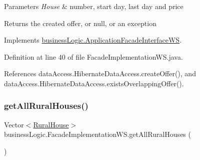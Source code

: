 \begin{DoxyParams}{Parameters}
{\em House} & number, start day, last day and price \\
\hline
\end{DoxyParams}
\begin{DoxyReturn}{Returns}
the created offer, or null, or an exception 
\end{DoxyReturn}


Implements \mbox{\hyperlink{interfacebusinessLogic_1_1ApplicationFacadeInterfaceWS_a0e8d2135ef1384a32e74f60bcea55f09}{business\+Logic.\+Application\+Facade\+Interface\+WS}}.



Definition at line 40 of file Facade\+Implementation\+W\+S.\+java.


\begin{DoxyCode}{0}

\end{DoxyCode}


References data\+Access.\+Hibernate\+Data\+Access.\+create\+Offer(), and data\+Access.\+Hibernate\+Data\+Access.\+exists\+Overlapping\+Offer().

\mbox{\label{classbusinessLogic_1_1FacadeImplementationWS_aa6f21ddb40ca6cd752a13e31ff016e7e}} 
\subsubsection{\texorpdfstring{getAllRuralHouses()}{getAllRuralHouses()}}
{\footnotesize\ttfamily Vector$<$\mbox{\hyperlink{classdomain_1_1RuralHouse}{Rural\+House}}$>$ business\+Logic.\+Facade\+Implementation\+W\+S.\+get\+All\+Rural\+Houses (\begin{DoxyParamCaption}{ }\end{DoxyParamCaption})}



